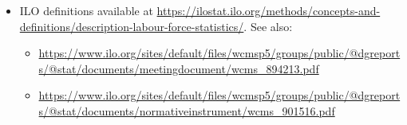 \documentclass[letterpaper, 12pt]{article}
\begin{document}
\begin{itemize}
    \item ILO definitions available at \href{https://ilostat.ilo.org/methods/concepts-and-definitions/description-labour-force-statistics/}{https://ilostat.ilo.org/methods/concepts-and-definitions/description-labour-force-statistics/}. 
    See also:
    \begin{itemize}
        \item \href{https://www.ilo.org/sites/default/files/wcmsp5/groups/public/@dgreports/@stat/documents/meetingdocument/wcms_894213.pdf}{https://www.ilo.org/sites/default/files/wcmsp5/groups/public/@dgreports/@stat/documents/meetingdocument/wcms\_894213.pdf}
        \item \href{https://www.ilo.org/sites/default/files/wcmsp5/groups/public/@dgreports/@stat/documents/normativeinstrument/wcms_901516.pdf}{https://www.ilo.org/sites/default/files/wcmsp5/groups/public/@dgreports/@stat/documents/normativeinstrument/wcms\_901516.pdf}
    \end{itemize}


\end{itemize}
\end{document}
